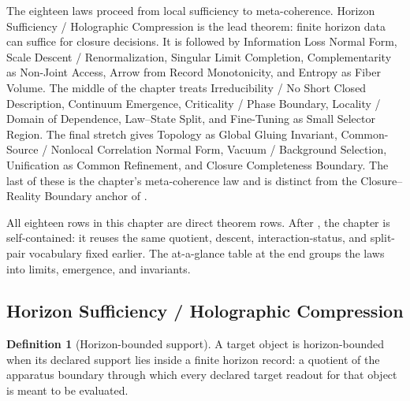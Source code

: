 \documentclass[11pt]{article}
\theoremstyle{definition}
\newtheorem{definition}[theorem]{Definition}
\begin{document}
The eighteen laws proceed from local sufficiency to meta-coherence.
Horizon Sufficiency / Holographic Compression is the lead theorem:
finite horizon data can suffice for closure decisions.  It is followed by
Information Loss Normal Form, Scale Descent / Renormalization,
Singular Limit Completion, Complementarity as Non-Joint Access, Arrow
from Record Monotonicity, and Entropy as Fiber Volume.  The middle of
the chapter treats Irreducibility / No Short Closed Description,
Continuum Emergence, Criticality / Phase Boundary, Locality / Domain
of Dependence, Law--State Split, and Fine-Tuning as Small Selector
Region.  The final stretch gives Topology as Global Gluing Invariant,
Common-Source / Nonlocal Correlation Normal Form, Vacuum / Background
Selection, Unification as Common Refinement, and Closure Completeness
Boundary.  The last of these is the chapter's meta-coherence law and
is distinct from the Closure--Reality Boundary anchor of
.

All eighteen rows in this chapter are direct theorem rows.  After
, the chapter is self-contained: it reuses the
same quotient, descent, interaction-status, and split-pair vocabulary
fixed earlier.  The at-a-glance table at the end groups the laws into
limits, emergence, and invariants.

\subsection{Horizon Sufficiency / Holographic Compression}\label{sec:self-reference-limits:horizon-sufficiency}

\begin{definition}[Horizon-bounded support]\label{def:horizon-bounded-support}
A target object is horizon-bounded when its declared support lies
inside a finite horizon record: a quotient of the apparatus boundary
through which every declared target readout for that object is meant
to be evaluated.
\end{definition}
\end{document}
